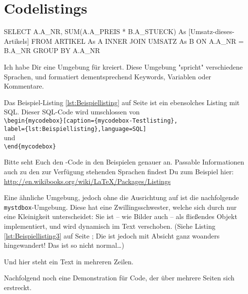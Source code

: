 \section{Codelistings}
\label{sec:codelist}

\begin{mycodebox}[caption={mycodebox-Testlisting},label={lst:Beispiellisting},language=SQL]
SELECT A.A_NR, SUM(A.A_PREIS * B.A_STUECK) As [Umsatz-dieses-Artikels]
FROM ARTIKEL As A INNER JOIN UMSATZ As B
ON A.A_NR = B.A_NR
GROUP BY A.A_NR
\end{mycodebox}


Ich habe Dir eine Umgebung für  kreiert. Diese Umgebung "spricht" verschiedene Sprachen, und formatiert dementsprechend Keywords, Variablen oder Kommentare.

Das Beispiel-Listing \ref{lst:Beispiellisting} auf Seite \pageref{lst:Beispiellisting} ist ein ebensolches Listing mit SQL. Dieser SQL-Code wird umschlossen von \\
\verb|\begin{mycodebox}[caption={mycodebox-Testlisting},| \\
\verb|label={lst:Beispiellisting},language=SQL]| \\
und \\
\verb|\end{mycodebox}|

Bitte seht Euch den \latex-Code in den Beispielen genauer an. Passable Informationen auch zu den zur Verfügung stehenden Sprachen findest Du zum Beispiel hier: \\
\url{http://en.wikibooks.org/wiki/LaTeX/Packages/Listings}

Eine ähnliche Umgebung, jedoch ohne die Ausrichtung auf  ist die nachfolgende \verb|mystdbox|-Umgebung. Diese hat eine Zwillingsschwester, welche sich durch nur eine Kleinigkeit unterscheidet: Sie ist -- wie Bilder auch -- als fließendes Objekt implementiert, und wird dynamisch im Text verschoben. (Siehe Listing \ref{lst:Beispiellisting3} auf Seite \pageref{lst:Beispiellisting3}; Die ist jedoch mit Absicht ganz woanders hingewandert! Das ist so nicht normal\dots)


\begin{mystdbox}[caption={mystdbox-Testlisting},label={lst:Beispiellisting2}]
Und hier steht
ein Text
in mehreren
Zeilen.
\end{mystdbox}




Nachfolgend noch eine Demonstration für Code, der über mehrere Seiten sich erstreckt.

